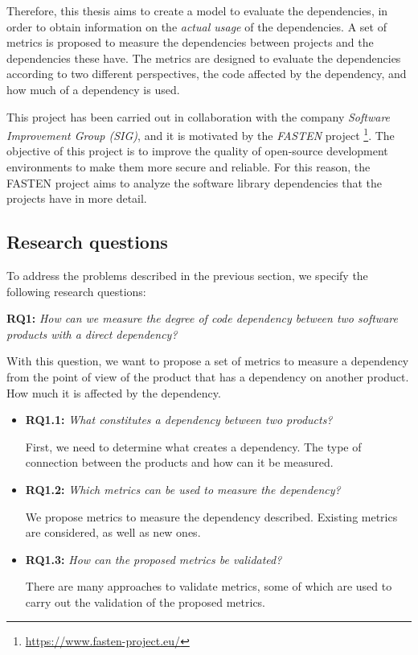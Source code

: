 \blankl
Therefore, this thesis aims to create a model to evaluate the dependencies, in order to obtain information on the \textit{actual usage} of the dependencies. A set of metrics is proposed to measure the dependencies between projects and the dependencies these have. The metrics are designed to evaluate the dependencies according to two different perspectives, the code affected by the dependency, and how much of a dependency is used.

This project has been carried out in collaboration with the company \textit{Software Improvement Group (SIG)}, and it is motivated by the \textit{FASTEN} project \footnote{\url{https://www.fasten-project.eu/}}. The objective of this project is to improve the quality of open-source development environments to make them more secure and reliable. For this reason, the FASTEN project aims to analyze the software library dependencies that the projects have in more detail.

\subsection{Research questions}
To address the problems described in the previous section, we specify the following research questions:

\blankl
\textbf{RQ1:} \textit{How can we measure the degree of code dependency between two software products with a direct dependency?}

\blankls
With this question, we want to propose a set of metrics to measure a dependency from the point of view of the product that has a dependency on another product. How much it is affected by the dependency.

\begin{itemize}
  \item \textbf{RQ1.1:} \textit{What constitutes a dependency between two products?}

  First, we need to determine what creates a dependency. The type of connection between the products and how can it be measured.

  \item \textbf{RQ1.2:} \textit{Which metrics can be used to measure the dependency?}

  We propose metrics to measure the dependency described. Existing metrics are considered, as well as new ones.

  \item \textbf{RQ1.3:} \textit{How can the proposed metrics be validated?}

  There are many approaches to validate metrics, some of which are used to carry out the validation of the proposed metrics.
\end{itemize}

